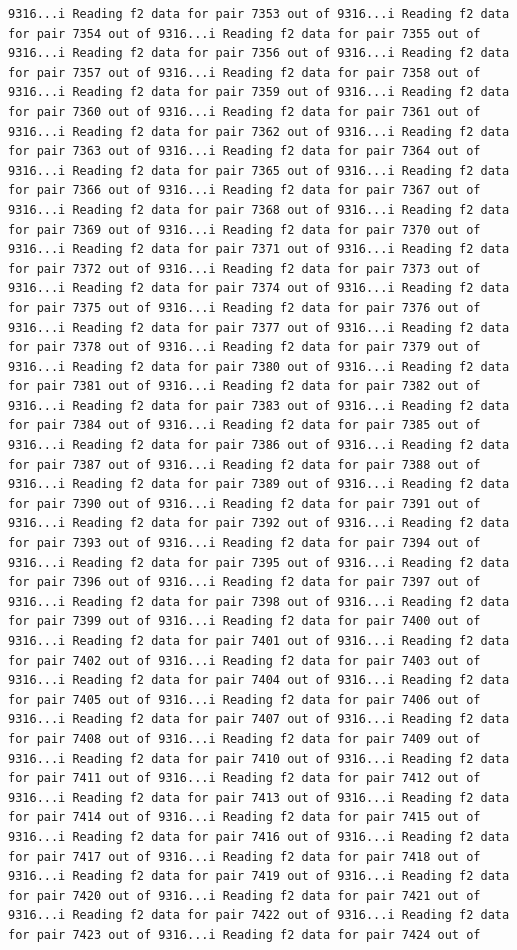 \documentclass[
]{article}
\begin{document}
\begin{verbatim}
9316...i Reading f2 data for pair 7353 out of 9316...i Reading f2 data for pair 7354 out of 9316...i Reading f2 data for pair 7355 out of 9316...i Reading f2 data for pair 7356 out of 9316...i Reading f2 data for pair 7357 out of 9316...i Reading f2 data for pair 7358 out of 9316...i Reading f2 data for pair 7359 out of 9316...i Reading f2 data for pair 7360 out of 9316...i Reading f2 data for pair 7361 out of 9316...i Reading f2 data for pair 7362 out of 9316...i Reading f2 data for pair 7363 out of 9316...i Reading f2 data for pair 7364 out of 9316...i Reading f2 data for pair 7365 out of 9316...i Reading f2 data for pair 7366 out of 9316...i Reading f2 data for pair 7367 out of 9316...i Reading f2 data for pair 7368 out of 9316...i Reading f2 data for pair 7369 out of 9316...i Reading f2 data for pair 7370 out of 9316...i Reading f2 data for pair 7371 out of 9316...i Reading f2 data for pair 7372 out of 9316...i Reading f2 data for pair 7373 out of 9316...i Reading f2 data for pair 7374 out of 9316...i Reading f2 data for pair 7375 out of 9316...i Reading f2 data for pair 7376 out of 9316...i Reading f2 data for pair 7377 out of 9316...i Reading f2 data for pair 7378 out of 9316...i Reading f2 data for pair 7379 out of 9316...i Reading f2 data for pair 7380 out of 9316...i Reading f2 data for pair 7381 out of 9316...i Reading f2 data for pair 7382 out of 9316...i Reading f2 data for pair 7383 out of 9316...i Reading f2 data for pair 7384 out of 9316...i Reading f2 data for pair 7385 out of 9316...i Reading f2 data for pair 7386 out of 9316...i Reading f2 data for pair 7387 out of 9316...i Reading f2 data for pair 7388 out of 9316...i Reading f2 data for pair 7389 out of 9316...i Reading f2 data for pair 7390 out of 9316...i Reading f2 data for pair 7391 out of 9316...i Reading f2 data for pair 7392 out of 9316...i Reading f2 data for pair 7393 out of 9316...i Reading f2 data for pair 7394 out of 9316...i Reading f2 data for pair 7395 out of 9316...i Reading f2 data for pair 7396 out of 9316...i Reading f2 data for pair 7397 out of 9316...i Reading f2 data for pair 7398 out of 9316...i Reading f2 data for pair 7399 out of 9316...i Reading f2 data for pair 7400 out of 9316...i Reading f2 data for pair 7401 out of 9316...i Reading f2 data for pair 7402 out of 9316...i Reading f2 data for pair 7403 out of 9316...i Reading f2 data for pair 7404 out of 9316...i Reading f2 data for pair 7405 out of 9316...i Reading f2 data for pair 7406 out of 9316...i Reading f2 data for pair 7407 out of 9316...i Reading f2 data for pair 7408 out of 9316...i Reading f2 data for pair 7409 out of 9316...i Reading f2 data for pair 7410 out of 9316...i Reading f2 data for pair 7411 out of 9316...i Reading f2 data for pair 7412 out of 9316...i Reading f2 data for pair 7413 out of 9316...i Reading f2 data for pair 7414 out of 9316...i Reading f2 data for pair 7415 out of 9316...i Reading f2 data for pair 7416 out of 9316...i Reading f2 data for pair 7417 out of 9316...i Reading f2 data for pair 7418 out of 9316...i Reading f2 data for pair 7419 out of 9316...i Reading f2 data for pair 7420 out of 9316...i Reading f2 data for pair 7421 out of 9316...i Reading f2 data for pair 7422 out of 9316...i Reading f2 data for pair 7423 out of 9316...i Reading f2 data for pair 7424 out of 
\end{verbatim}
\end{document}
